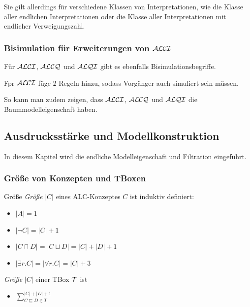 Sie gilt allerdings für verschiedene Klassen von Interpretationen, wie die Klasse aller endlichen Interpretationen oder die Klasse aller Interpretationen mit endlicher Verweigungszahl.

\subsubsection{Bisimulation für Erweiterungen von $\mathcal{A}\mathcal{L}\mathcal{C}\mathcal{I}$}\label{bisimulation-in-alci}

Für $\mathcal{A}\mathcal{L}\mathcal{C}\mathcal{I}$, $\mathcal{A}\mathcal{L}\mathcal{C}\mathcal{Q}$ und $\mathcal{A}\mathcal{L}\mathcal{Q}\mathcal{I}$ gibt es ebenfalls Bisimulationsbegriffe.

Fpr $\mathcal{A}\mathcal{L}\mathcal{C}\mathcal{I}$ füge 2 Regeln hinzu, sodass Vorgänger auch simuliert sein müssen.

So kann man zudem zeigen, dass $\mathcal{A}\mathcal{L}\mathcal{C}\mathcal{I}$, $\mathcal{A}\mathcal{L}\mathcal{C}\mathcal{Q}$ und $\mathcal{A}\mathcal{L}\mathcal{Q}\mathcal{I}$ die Baummodelleigenschaft haben.

\subsection{Ausdrucksstärke und
Modellkonstruktion}\label{ausdrucksstuxe4rke-und-modellkonstruktion}

In diesem Kapitel wird die endliche Modelleigenschaft und Filtration eingeführt.

\subsubsection{Größe von Konzepten und
TBoxen}\label{gruxf6uxdfe-von-konzepten-und-tboxen}

\begin{definition}{Größe}
\emph{Größe} $\left| C \right|$ eines ALC-Konzeptes $C$ ist induktiv
definiert:

\begin{itemize}
\item
  $\left| A \right| = 1$
\item
  $\left| \neg C \right| = \left| C \right| + 1$
\item
  $\left| C \sqcap D \right| = \left| C \sqcup D \right| = \left| C \right| + \left| D \right| + 1$
\item
  $\left| \exists r.C \right| = \left| \forall r.C \right| = \left| C \right| + 3$
\end{itemize}

\emph{Größe} $\left| C \right|$ einer TBox $\mathcal{T}$ ist

\begin{itemize}
\item
  $\sum_{C \sqsubseteq D \in T}^{\left| C \right| + \left| D \right| + 1}$
\end{itemize}
\end{definition}

